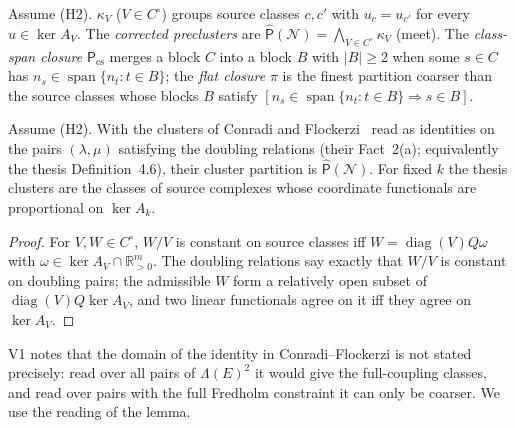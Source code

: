 \documentclass[11pt,a4paper]{report}
\newcommand{\Net}{\mathcal{N}}
\newcommand{\spn}{\operatorname{span}}
\newcommand{\Pcs}{\mathsf{P}_{\mathrm{cs}}}
\newcommand{\Ph}{\widehat{\mathsf{P}}}
\newcommand{\Rp}{\mathbb{R}_{>0}}
\begin{document}
\begin{definition}[agent Q2]\label{def:Phat}
Assume (H2). \(\kappa_V\) (\(V\in C^\circ\)) groups source classes \(c,c'\) with \(u_c=u_{c'}\) for every
\(u\in\ker A_V\). The \emph{corrected preclusters} are \(\Ph(\Net)=\bigwedge_{V\in C^\circ}\kappa_V\) (meet). The
\emph{class-span closure} \(\Pcs\) merges a block \(C\) into a block \(B\) with \(|B|\ge2\) when some \(s\in C\) has
\(n_s\in\spn\{n_t:t\in B\}\); the \emph{flat closure} \(\pi\) is the finest partition coarser than the source classes
whose blocks \(B\) satisfy \([n_s\in\spn\{n_t:t\in B\}\Rightarrow s\in B]\).
\end{definition}

\begin{lemma}\label{lem:CF}
Assume (H2). With the clusters of Conradi and Flockerzi~\autocite[Fact~2(b), Alg.~1]{ConradiFlockerzi2012} read as
identities on the pairs \((\lambda,\mu)\) satisfying the doubling relations (their Fact~2(a); equivalently the thesis
Definition~4.6), their cluster partition is \(\Ph(\Net)\). For fixed \(k\) the thesis clusters are the classes of
source complexes whose coordinate functionals are proportional on \(\ker A_k\).
\end{lemma}
\begin{proof}
For \(V,W\in C^\circ\), \(W/V\) is constant on source classes iff \(W=\operatorname{diag}(V)Q\omega\) with
\(\omega\in\ker A_V\cap\Rp^m\). The doubling relations say exactly that \(W/V\) is constant on doubling pairs; the
admissible \(W\) form a relatively open subset of \(\operatorname{diag}(V)Q\ker A_V\), and two linear functionals agree
on it iff they agree on \(\ker A_V\).
\end{proof}

V1 notes that the domain of the identity in Conradi--Flockerzi is not stated precisely: read over all pairs of
\(\Lambda(E)^2\) it would give the full-coupling classes, and read over pairs with the full Fredholm constraint it can
only be coarser. We use the reading of the lemma.
\end{document}
